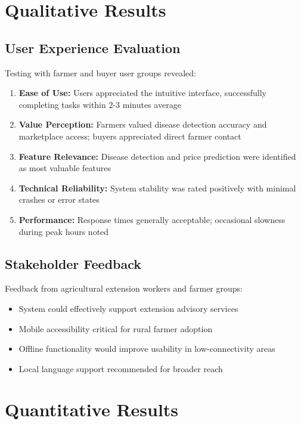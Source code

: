 \documentclass[12pt,a4paper]{report}
\begin{document}
\section{Qualitative Results}

\subsection{User Experience Evaluation}

Testing with farmer and buyer user groups revealed:

\begin{enumerate}
    \item \textbf{Ease of Use:} Users appreciated the intuitive interface, successfully completing tasks within 2-3 minutes average
    \item \textbf{Value Perception:} Farmers valued disease detection accuracy and marketplace access; buyers appreciated direct farmer contact
    \item \textbf{Feature Relevance:} Disease detection and price prediction were identified as most valuable features
    \item \textbf{Technical Reliability:} System stability was rated positively with minimal crashes or error states
    \item \textbf{Performance:} Response times generally acceptable; occasional slowness during peak hours noted
\end{enumerate}

\subsection{Stakeholder Feedback}

Feedback from agricultural extension workers and farmer groups:
\begin{itemize}
    \item System could effectively support extension advisory services
    \item Mobile accessibility critical for rural farmer adoption
    \item Offline functionality would improve usability in low-connectivity areas
    \item Local language support recommended for broader reach
\end{itemize}

\section{Quantitative Results}
\end{document}
